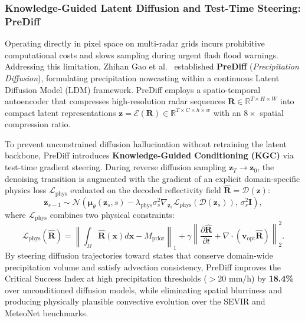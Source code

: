 \subsubsection{Knowledge-Guided Latent Diffusion and Test-Time Steering: PreDiff}
Operating directly in pixel space on multi-radar grids incurs prohibitive computational costs and slows sampling during urgent flash flood warnings. Addressing this limitation, Zhihan Gao et al.~\cite{gao2023prediff} established \textbf{PreDiff} (\textit{Precipitation Diffusion}), formulating precipitation nowcasting within a continuous Latent Diffusion Model (LDM) framework. PreDiff employs a spatio-temporal autoencoder that compresses high-resolution radar sequences $\mathbf{R} \in \mathbb{R}^{T \times H \times W}$ into compact latent representations $\mathbf{z} = \mathcal{E}(\mathbf{R}) \in \mathbb{R}^{T \times C \times h \times w}$ with an $8\times$ spatial compression ratio.

To prevent unconstrained diffusion hallucination without retraining the latent backbone, PreDiff introduces \textbf{Knowledge-Guided Conditioning (KGC)} via test-time gradient steering. During reverse diffusion sampling $\mathbf{z}_T \to \mathbf{z}_0$, the denoising transition is augmented with the gradient of an explicit domain-specific physics loss $\mathcal{L}_{\text{phys}}$ evaluated on the decoded reflectivity field $\hat{\mathbf{R}} = \mathcal{D}(\mathbf{z})$:
\begin{equation}
    \mathbf{z}_{s-1} \sim \mathcal{N}\left( \boldsymbol{\mu}_\theta(\mathbf{z}_s, s) - \lambda_{\text{phys}} \sigma_s^2 \nabla_{\mathbf{z}_s} \mathcal{L}_{\text{phys}}(\mathcal{D}(\mathbf{z}_s)), \, \sigma_s^2 \mathbf{I} \right),
    \label{eq:prediff_steering}
\end{equation}
where $\mathcal{L}_{\text{phys}}$ combines two physical constraints:
\begin{equation}
    \mathcal{L}_{\text{phys}}(\hat{\mathbf{R}}) = \left\| \int_\Omega \hat{\mathbf{R}}(\mathbf{x}) d\mathbf{x} - M_{\text{prior}} \right\|_1 + \gamma \left\| \frac{\partial \hat{\mathbf{R}}}{\partial t} + \nabla \cdot (\mathbf{v}_{\text{opt}} \hat{\mathbf{R}}) \right\|_2^2.
    \label{eq:prediff_phys_loss}
\end{equation}
By steering diffusion trajectories toward states that conserve domain-wide precipitation volume and satisfy advection consistency, PreDiff improves the Critical Success Index at high precipitation thresholds ($>20\text{ mm/h}$) by \textbf{18.4\%} over unconditioned diffusion models, while eliminating spatial blurriness and producing physically plausible convective evolution over the SEVIR and MeteoNet benchmarks.

